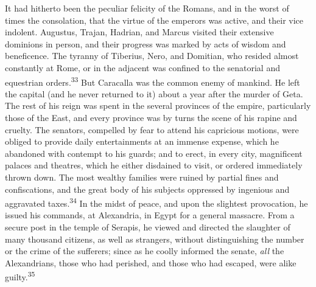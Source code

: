 




It had hitherto been the peculiar felicity of the Romans, and in
the worst of times the consolation, that the virtue of the
emperors was active, and their vice indolent. Augustus, Trajan,
Hadrian, and Marcus visited their extensive dominions in person,
and their progress was marked by acts of wisdom and beneficence.
The tyranny of Tiberius, Nero, and Domitian, who resided almost
constantly at Rome, or in the adjacent was confined to the
senatorial and equestrian orders.\textsuperscript{33} But Caracalla was the common
enemy of mankind. He left the capital (and he never returned to
it) about a year after the murder of Geta. The rest of his reign
was spent in the several provinces of the empire, particularly
those of the East, and every province was by turns the scene of
his rapine and cruelty. The senators, compelled by fear to attend
his capricious motions, were obliged to provide daily
entertainments at an immense expense, which he abandoned with
contempt to his guards; and to erect, in every city, magnificent
palaces and theatres, which he either disdained to visit, or
ordered immediately thrown down. The most wealthy families were
ruined by partial fines and confiscations, and the great body of
his subjects oppressed by ingenious and aggravated taxes.\textsuperscript{34} In
the midst of peace, and upon the slightest provocation, he issued
his commands, at Alexandria, in Egypt for a general massacre.
From a secure post in the temple of Serapis, he viewed and
directed the slaughter of many thousand citizens, as well as
strangers, without distinguishing the number or the crime of the
sufferers; since as he coolly informed the senate, \textit{all} the
Alexandrians, those who had perished, and those who had escaped,
were alike guilty.\textsuperscript{35}

